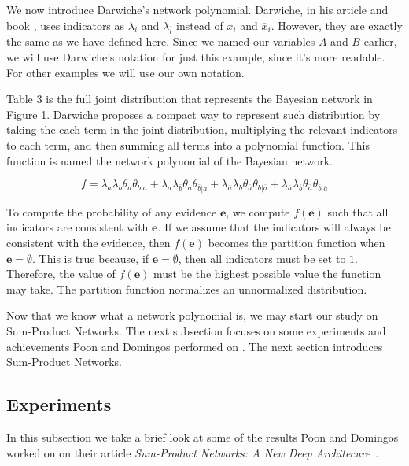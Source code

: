 \documentclass[a4paper,10pt]{article}
\theoremstyle{plain}
\begin{document}
We now introduce Darwiche's network polynomial. Darwiche, in his article and book
\cite{diff-approach-darwiche,bayes-net-darwiche}, uses indicators as $\lambda_i$ and
$\lambda_{\overline{i}}$ instead of $x_i$ and $\overline{x}_i$. However, they are exactly the same
as we have defined here. Since we named our variables $A$ and $B$ earlier, we will use Darwiche's
notation for just this example, since it's more readable. For other examples we will use our own
notation.

Table 3 is the full joint distribution that represents the Bayesian network in Figure 1. Darwiche
proposes a compact way to represent such distribution by taking the each term in the joint
distribution, multiplying the relevant indicators to each term, and then summing all terms into
a polynomial function. This function is named the network polynomial of the Bayesian network.

\begin{equation}
  f = \lambda_a\lambda_b\theta_a\theta_{b|a} +
      \lambda_a\lambda_{\overline{b}}\theta_a\theta_{\overline{b}|a} +
      \lambda_{\overline{a}}\lambda_b\theta_{\overline{a}}\theta_{b|\overline{a}} +
      \lambda_{\overline{a}}\lambda_{\overline{b}}\theta_{\overline{a}}\theta_{\overline{b}|\overline{a}}
\end{equation}

To compute the probability of any evidence $\mathbf{e}$, we compute $f(\mathbf{e})$ such that all
indicators are consistent with $\mathbf{e}$. If we assume that the indicators will always be
consistent with the evidence, then $f(\mathbf{e})$ becomes the partition function when
$\mathbf{e}=\emptyset$. This is true because, if $\mathbf{e}=\emptyset$, then all indicators must
be set to $1$. Therefore, the value of $f(\mathbf{e})$ must be the highest possible value the
function may take. The partition function normalizes an unnormalized distribution.

Now that we know what a network polynomial is, we may start our study on Sum-Product Networks.
The next subsection focuses on some experiments and achievements Poon and Domingos performed on
\cite{poon-domingos}. The next section introduces Sum-Product Networks.

\subsection{Experiments}

In this subsection we take a brief look at some of the results Poon and Domingos worked on on their
article \textit{Sum-Product Networks: A New Deep Architecure}~\cite{poon-domingos}.
\end{document}
